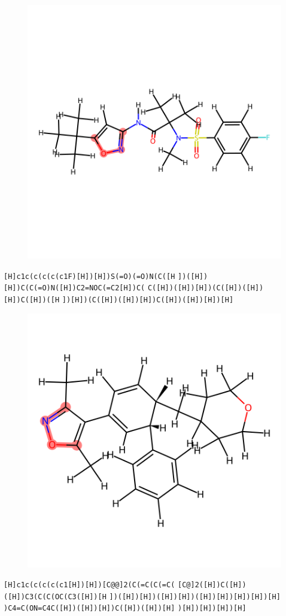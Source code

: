 \documentclass{article}
\begin{document}
\begin{figure}[ht]
\centering
    \includegraphics{mol148.png}
\end{figure}
\verb|[H]c1c(c(c(c(c1F)[H])[H])S(=O)(=O)N(C([H| \verb|])([H])[H])C(C(=O)N([H])C2=NOC(=C2[H])C(| \verb|C([H])([H])[H])(C([H])([H])[H])C([H])([H| \verb|])[H])(C([H])([H])[H])C([H])([H])[H])[H]|

\begin{figure}[ht]
\centering
    \includegraphics{mol149.png}
\end{figure}
\verb|[H]c1c(c(c(c(c1[H])[H])[C@@]2(C(=C(C(=C(| \verb|[C@]2([H])C([H])([H])C3(C(C(OC(C3([H])[H| \verb|])([H])[H])([H])[H])([H])[H])[H])[H])[H]| \verb|)C4=C(ON=C4C([H])([H])[H])C([H])([H])[H]| \verb|)[H])[H])[H])[H]|
\end{document}
